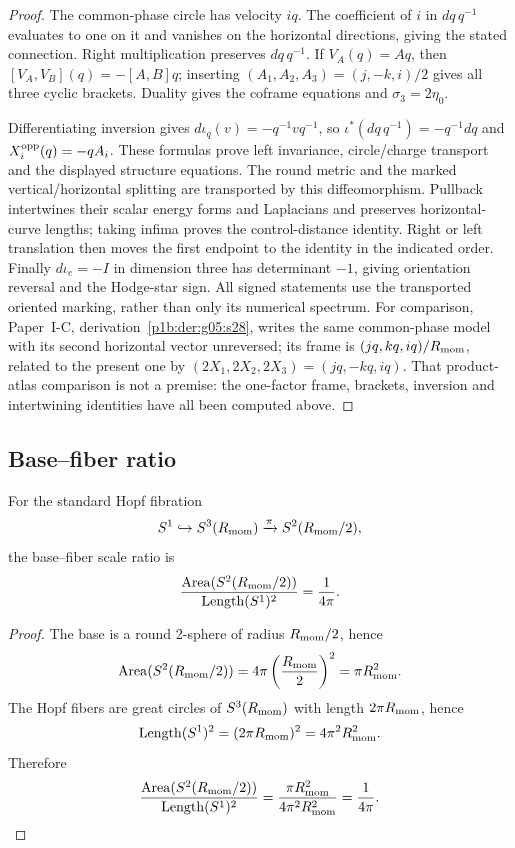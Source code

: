 \documentclass[11pt]{article}
\begin{document}
\begin{proof}
The common-phase circle has velocity \(iq\).  The coefficient of \(i\) in
\(dq\,q^{-1}\) evaluates to one on it and vanishes on the horizontal
directions, giving the stated connection.  Right multiplication preserves
\(dq\,q^{-1}\).  If \(V_A(q)=Aq\), then
\([V_A,V_B](q)=-[A,B]q\); inserting
\((A_1,A_2,A_3)=(j,-k,i)/2\) gives all three cyclic brackets.
Duality gives the coframe equations and \(\sigma_3=2\eta_0\).

Differentiating inversion gives
\(d\iota_q(v)=-q^{-1}vq^{-1}\), so
\(\iota^*(dq\,q^{-1})=-q^{-1}dq\) and
\(X_i^{\rm opp}(q)=-qA_i\).  These formulas prove left invariance,
circle/charge transport and the displayed structure equations.  The round
metric and the marked vertical/horizontal splitting are transported by
this diffeomorphism.  Pullback intertwines their scalar energy forms and
Laplacians and preserves horizontal-curve lengths; taking infima proves
the control-distance identity.  Right or left translation then moves the
first endpoint to the identity in the indicated order.
Finally \(d\iota_e=-I\) in dimension three has determinant \(-1\), giving
orientation reversal and the Hodge-star sign.  All signed statements use
the transported oriented marking, rather than only its numerical spectrum.
For comparison, Paper~I-C, derivation~\ref{p1b:der:g05:s28}, writes
the same common-phase
model with its second horizontal vector unreversed; its frame is
\((j q,k q,i q)/R_{\mathrm{mom}}\), related to the present one by
\((2X_1,2X_2,2X_3)=(j q,-k q,i q)\).
That product-atlas comparison is not a premise: the one-factor frame,
brackets, inversion and intertwining identities have all been computed above.
\end{proof}

\subsection{Base--fiber ratio}
\begin{proposition}
\label{p1:prop:base_fiber_ratio}
For the standard Hopf fibration
\[
S^1 \hookrightarrow S^3(R_{\mathrm{mom}})\xrightarrow{\pi} S^2(R_{\mathrm{mom}}/2),
\]
the base--fiber scale ratio is
\[
\frac{\mathrm{Area}(S^2(R_{\mathrm{mom}}/2))}{\mathrm{Length}(S^1)^2}
=\frac{1}{4\pi}.
\]
\end{proposition}

\begin{proof}
The base is a round 2-sphere of radius $R_{\mathrm{mom}}/2$, hence
\[
\mathrm{Area}(S^2(R_{\mathrm{mom}}/2)) = 4\pi\left(\frac{R_{\mathrm{mom}}}{2}\right)^2 = \pi R_{\mathrm{mom}}^2.
\]
The Hopf fibers are great circles of $S^3(R_{\mathrm{mom}})$ with length $2\pi R_{\mathrm{mom}}$, hence
\[
\mathrm{Length}(S^1)^2 = (2\pi R_{\mathrm{mom}})^2 = 4\pi^2 R_{\mathrm{mom}}^2.
\]
Therefore
\[
\frac{\mathrm{Area}(S^2(R_{\mathrm{mom}}/2))}{\mathrm{Length}(S^1)^2}
= \frac{\pi R_{\mathrm{mom}}^2}{4\pi^2 R_{\mathrm{mom}}^2}
= \frac{1}{4\pi}.
\]
\end{proof}
\end{document}
